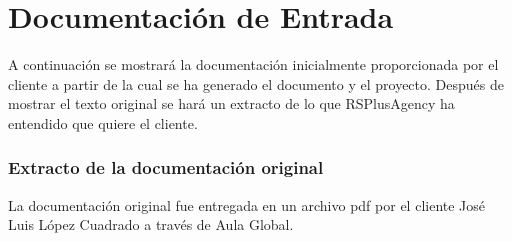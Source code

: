 \chapter{Documentación de Entrada}\label{sec:initialdocs}
\par A continuación se mostrará la documentación inicialmente proporcionada por el cliente a partir de la cual se ha generado el documento y el proyecto. Después de mostrar el texto original se hará un extracto de lo que RSPlusAgency ha entendido que quiere el cliente.
\subsection{Extracto de la documentación original}
\par La documentación original fue entregada en un archivo pdf por el cliente José Luis López Cuadrado a través de Aula Global.


